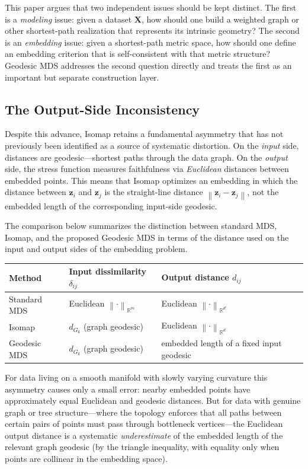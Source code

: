 \documentclass[twoside,11pt]{article}
\newcommand{\R}{\mathbb{R}}
\newcommand{\bX}{\mathbf{X}}
\newcommand{\bz}{\mathbf{z}}
\newcommand{\norm}[1]{\left\|#1\right\|}
\begin{document}
This paper argues that two independent issues should be kept distinct.  The
first is a \emph{modeling} issue: given a dataset $\bX$, how should one build
a weighted graph or other shortest-path realization that represents its
intrinsic geometry?  The second is an \emph{embedding} issue: given a
shortest-path metric space, how should one define an embedding criterion that
is self-consistent with that metric structure?  Geodesic MDS addresses the
second question directly and treats the first as an important but separate
construction layer.

\subsection{The Output-Side Inconsistency}

Despite this advance, Isomap retains a fundamental asymmetry that has not
previously been identified as a source of systematic distortion.  On the
\emph{input} side, distances are geodesic---shortest paths through the data
graph.  On the \emph{output} side, the stress function measures faithfulness
via \emph{Euclidean} distances between embedded points.  This means that
Isomap optimizes an embedding in which the distance between $\bz_i$ and
$\bz_j$ is the straight-line distance $\norm{\bz_i - \bz_j}$, not the
embedded length of the corresponding input-side geodesic.

The comparison below summarizes the distinction between standard MDS,
Isomap, and the proposed Geodesic MDS in terms of the distance used on
the input and output sides of the embedding problem.

\begin{center}
  \small
  \begin{tabular}{@{}p{}p{}p{}@{}}
    \toprule
    Method & Input dissimilarity $\delta_{ij}$ & Output distance $d_{ij}$ \\
    \midrule
    Standard MDS & Euclidean $\norm{\cdot}_{\R^m}$ & Euclidean $\norm{\cdot}_{\R^d}$ \\
    Isomap & $d_{G_k}$ (graph geodesic) & Euclidean $\norm{\cdot}_{\R^d}$ \\
    Geodesic MDS & $d_{G_k}$ (graph geodesic) & embedded length of a fixed input geodesic \\
    \bottomrule
  \end{tabular}
\end{center}

For data living on a smooth manifold with slowly varying curvature this
asymmetry causes only a small error: nearby embedded points have
approximately equal Euclidean and geodesic distances.  But for data with
genuine graph or tree structure---where the topology enforces that all
paths between certain pairs of points must pass through bottleneck
vertices---the Euclidean output distance is a systematic \emph{underestimate}
of the embedded length of the relevant graph geodesic (by the triangle inequality, with
equality only when points are collinear in the embedding space).
\end{document}
